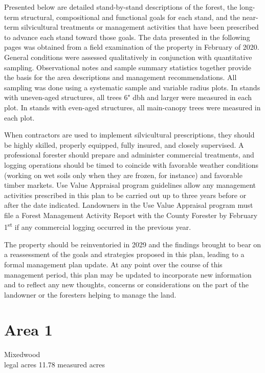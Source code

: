 \documentclass[]{tufte-handout}
\begin{document}
Presented below are detailed stand-by-stand descriptions of the forest,
the long-term structural, compositional and functional goals for each
stand, and the near-term silvicultural treatments or management
activities that have been prescribed to advance each stand toward those
goals. The data presented in the following pages was obtained from a
field examination of the property in February of 2020. General
conditions were assessed qualitatively in conjunction with quantitative
sampling. Observational notes and sample summary statistics together
provide the basis for the area descriptions and management
recommendations. All sampling was done using a systematic sample and
variable radius plots. In stands with uneven-aged structures, all trees
6" dbh and larger were measured in each plot. In stands with even-aged
structures, all main-canopy trees were measured in each plot.

When contractors are used to implement silvicultural prescriptions, they
should be highly skilled, properly equipped, fully insured, and closely
supervised. A professional forester should prepare and administer
commercial treatments, and logging operations should be timed to
coincide with favorable weather conditions (working on wet soils only
when they are frozen, for instance) and favorable timber markets. Use
Value Appraisal program guidelines allow any management activities
prescribed in this plan to be carried out up to three years before or
after the date indicated. Landowners in the Use Value Appraisal program
must file a Forest Management Activity Report with the County Forester
by February 1\textsuperscript{st} if any commercial logging occurred in
the previous year.

The property should be reinventoried in 2029 and the findings brought to
bear on a reassessment of the goals and strategies proposed in this
plan, leading to a formal management plan update. At any point over the
course of this management period, this plan may be updated to
incorporate new information and to reflect any new thoughts, concerns or
considerations on the part of the landowner or the foresters helping to
manage the land.

\newpage

\section{Area 1}\label{area-1}

Mixedwood\\
 legal acres \textbar{} 11.78 measured acres
\end{document}
